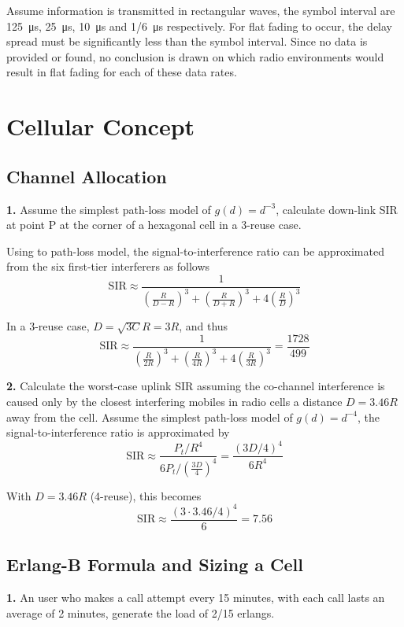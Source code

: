 \documentclass[a4paper,12pt]{article}
\newcommand{\SIR}{\mathrm{SIR}}
\newcommand{\problem}[1]{\noindent\textbf{#1.}}
\begin{document}
Assume information is transmitted in rectangular waves, the symbol interval
are \SI{125}{\micro\second}, \SI{25}{\micro\second}, \SI{10}{\micro\second}
and \SI{1/6}{\micro\second} respectively.  For flat fading to occur,
the delay spread must be significantly less than the symbol interval.
Since no data is provided or found, no conclusion is drawn on which
radio environments would result in flat fading for each of these data rates.

\section{Cellular Concept}
\subsection{Channel Allocation}
\problem 1  Assume the simplest path-loss model of $g(d) = d^{-3}$, calculate
down-link SIR at point P at the corner of a hexagonal cell in a 3-reuse case.

Using to path-loss model, the signal-to-interference ratio
can be approximated from the six first-tier interferers as follows
\[\SIR \approx \frac{1}{\left(\frac{R}{D-R}\right)^3
                        + \left(\frac{R}{D+R}\right)^3
                        + 4\left(\frac{R}{D}\right)^3}\]

In a 3-reuse case, $D = \sqrt{3C}R = 3R$, and thus
\[\SIR \approx \frac{1}{\left(\frac{R}{2R}\right)^3
                        + \left(\frac{R}{4R}\right)^3
                        + 4\left(\frac{R}{3R}\right)^3} = \frac{1728}{499}\]

\problem 2  Calculate the worst-case uplink SIR assuming the co-channel
interference is caused only by the closest interfering mobiles in radio cells
a distance $D = 3.46R$ away from the cell.  Assume the simplest path-loss model
of $g(d) = d^{-4}$, the signal-to-interference ratio is approximated by
\[\SIR \approx \frac{P_t/R^4}{6P_t/\left(\frac{3D}{4}\right)^4}
= \frac{(3D/4)^4}{6R^4}\]

With $D = 3.46R$ (4-reuse), this becomes
\[\SIR \approx \frac{(3\cdot3.46/4)^4}{6} = 7.56\]

\subsection{Erlang-B Formula and Sizing a Cell}
\problem 1  An user who makes a call attempt every 15 minutes, with each call
lasts an average of 2 minutes, generate the load of 2/15 erlangs.
\end{document}
